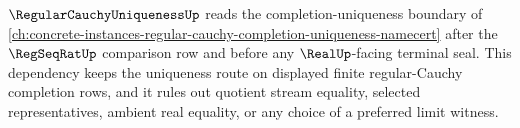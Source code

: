 $\RegularCauchyUniquenessUp$ reads the completion-uniqueness boundary of \autoref{ch:concrete-instances-regular-cauchy-completion-uniqueness-namecert} after the $\RegSeqRatUp$ comparison row and before any $\RealUp$-facing terminal seal. This dependency keeps the uniqueness route on displayed finite regular-Cauchy completion rows, and it rules out quotient stream equality, selected representatives, ambient real equality, or any choice of a preferred limit witness.
